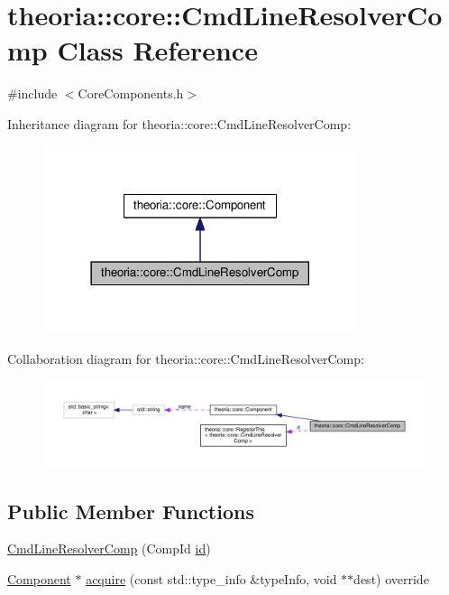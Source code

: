 \hypertarget{classtheoria_1_1core_1_1CmdLineResolverComp}{}\section{theoria\+:\+:core\+:\+:Cmd\+Line\+Resolver\+Comp Class Reference}
\label{classtheoria_1_1core_1_1CmdLineResolverComp}


{\ttfamily \#include $<$Core\+Components.\+h$>$}



Inheritance diagram for theoria\+:\+:core\+:\+:Cmd\+Line\+Resolver\+Comp\+:\nopagebreak
\begin{figure}[H]
\begin{center}
\leavevmode
\includegraphics[width=261pt]{classtheoria_1_1core_1_1CmdLineResolverComp__inherit__graph}
\end{center}
\end{figure}


Collaboration diagram for theoria\+:\+:core\+:\+:Cmd\+Line\+Resolver\+Comp\+:\nopagebreak
\begin{figure}[H]
\begin{center}
\leavevmode
\includegraphics[width=350pt]{classtheoria_1_1core_1_1CmdLineResolverComp__coll__graph}
\end{center}
\end{figure}
\subsection*{Public Member Functions}
\begin{DoxyCompactItemize}
\item 
\hyperlink{classtheoria_1_1core_1_1CmdLineResolverComp_a4ed2c4896e0d20384e78c588f158c172}{Cmd\+Line\+Resolver\+Comp} (Comp\+Id \hyperlink{classtheoria_1_1core_1_1Component_ab539df9f996efceda7743fa1b69cd25d}{id})
\item 
\hyperlink{classtheoria_1_1core_1_1Component}{Component} $\ast$ \hyperlink{classtheoria_1_1core_1_1CmdLineResolverComp_a51c66e964d559b3e13f4386c0bf0e0c0}{acquire} (const std\+::type\+\_\+info \&type\+Info, void $\ast$$\ast$dest) override
\end{DoxyCompactItemize}
